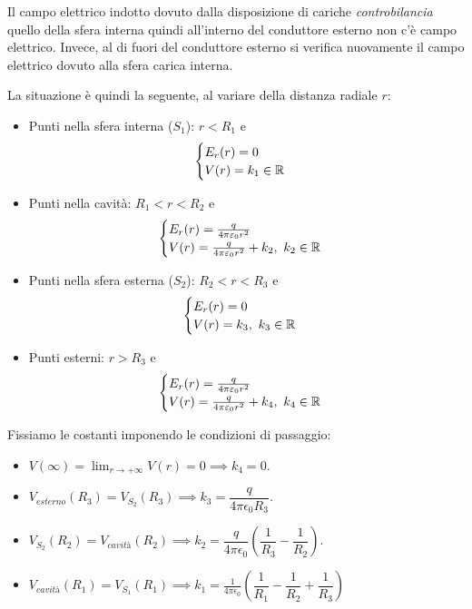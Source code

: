 Il campo elettrico indotto dovuto dalla disposizione di cariche \textit{controbilancia} quello della sfera interna quindi all'interno del conduttore esterno non c'è campo elettrico. Invece, al di fuori del conduttore esterno si verifica nuovamente il campo elettrico dovuto alla sfera carica interna. 

La situazione è quindi la seguente, al variare della distanza radiale $r$:
\begin{itemize}
	\item Punti nella sfera interna ($S_1$): $r<R_1$ e
	\begin{equation*}
		\begin{cases}
			E_{r}(r)=0\\
			V(r)=k_1\in\mathbb{R}
		\end{cases}
	\end{equation*}
\item Punti nella cavità: $R_1<r<R_2$ e
\begin{equation*}
\begin{cases}
	E_{r}(r)=\frac{q}{4\pi\varepsilon_0r^2}\\
	V(r)=\frac{q}{4\pi\varepsilon_0r^2}+k_2, \ k_2\in\mathbb{R}
\end{cases}
\end{equation*}
\item Punti nella sfera esterna ($S_2$): $R_2<r<R_3$ e
\begin{equation*}
\begin{cases}
	E_{r}(r)=0\\
	V(r)=k_3, \ k_3\in\mathbb{R}
\end{cases}
\end{equation*}
\item Punti esterni: $r>R_3$ e
\begin{equation*}
	\begin{cases}
		E_{r}(r)=\frac{q}{4\pi\varepsilon_0 r^2}\\
		V(r)=\frac{q}{4\pi\varepsilon_0r^2}+k_4, \ k_4\in\mathbb{R}
	\end{cases}
\end{equation*}
\end{itemize}
Fissiamo le costanti imponendo le condizioni di passaggio:
\begin{itemize}
	\item $V(\infty)=\lim_{r\to+\infty}V(r)=0\implies k_4=0$.
	\item $V_{esterno}(R_3)=V_{S_2}(R_3)\implies k_3=\dfrac{q}{4\pi\epsilon_0R_3}$.
	\item $V_{S_2}(R_2)=V_{cavità}(R_2)\implies k_2=\dfrac{q}{4\pi\epsilon_0}\left(\dfrac{1}{R_3}-\dfrac{1}{R_2}\right)$.
	\item $V_{cavità}(R_1)=V_{S_1}(R_1)\implies k_1=\frac{1}{4\pi\epsilon_0}\left(\dfrac{1}{R_1}-\dfrac{1}{R_2}+\dfrac{1}{R_3}\right)$
\end{itemize}
